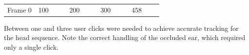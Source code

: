 \documentclass[portrait,final,a0paper,fontscale=0.277]{baposter}
\begin{document}
\begin{poster}
  \begin{tabular*}{\linewidth}{*{5}{@{}p{0.2\linewidth}@{}}}
    {\hfill{}Frame 0\hfill{}}  &
    {\hfill{}100\hfill{}} &
    {\hfill{}200\hfill{}} &
    {\hfill{}300\hfill{}} &
    {\hfill{}458\hfill{}} 
  \end{tabular*}
      \begin{multicols}{2}
    Between one and three user clicks were needed to achieve accurate tracking for
      the head sequence. Note the correct handling of the occluded ear, which
      required only a single click. 


\end{multicols}
\end{poster}
\end{document}
